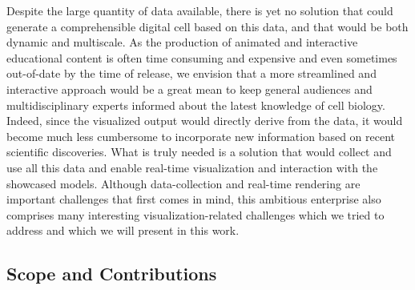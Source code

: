 Despite the large quantity of data available, there is yet no solution that could generate a comprehensible digital cell based on this data, and that would be both dynamic and multiscale.
As the production of animated and interactive educational content is often time consuming and expensive and even sometimes out-of-date by the time of release, we envision that a more streamlined and interactive approach would be a great mean to keep general audiences and multidisciplinary experts informed about the latest knowledge of cell biology.
Indeed, since the visualized output would directly derive from the data, it would become much less cumbersome to incorporate new information based on recent scientific discoveries.
What is truly needed is a solution that would collect and use all this data and enable real-time visualization and interaction with the showcased models. 
Although data-collection and real-time rendering are important challenges that first comes in mind, this ambitious enterprise also comprises many interesting visualization-related challenges which we tried to address and which we will present in this work.

\subsection{Scope and Contributions}

